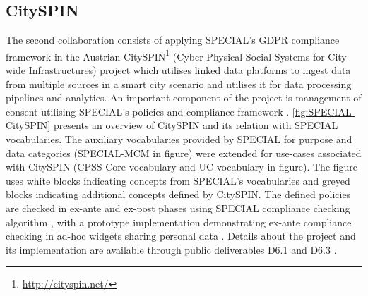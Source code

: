 

\subsection*{CitySPIN}
The second collaboration consists of applying SPECIAL's GDPR compliance framework in the Austrian CitySPIN\footnote{\url{http://cityspin.net/}} (Cyber-Physical Social Systems for City-wide Infrastructures) project \cite{fernandez_user_2019} which utilises linked data platforms to ingest data from multiple sources in a smart city scenario and utilises it for data processing pipelines and analytics. An important component of the project is management of consent utilising SPECIAL's policies \cite{bonatti_special_2018-1,bonatti_special_2018-2} and compliance framework \cite{kirrane_scalable_2018}.
\autoref{fig:SPECIAL-CitySPIN} presents an overview of CitySPIN and its relation with SPECIAL vocabularies. The auxiliary vocabularies provided by SPECIAL for purpose and data categories (SPECIAL-MCM in figure) were extended for use-cases associated with CitySPIN (CPSS Core vocabulary and UC vocabulary in figure).
The figure uses white blocks indicating concepts from SPECIAL's vocabularies and greyed blocks indicating additional concepts defined by CitySPIN.
The defined policies are checked in ex-ante and ex-post phases using SPECIAL compliance checking algorithm \cite{bonatti_fast_2018,bonatti_richer_2019}, with a prototype implementation demonstrating ex-ante compliance checking in ad-hoc widgets sharing personal data \cite{fernandez_privacy-aware_2019}. Details about the project and its implementation are available through  public deliverables D6.1 \cite{noauthor_d6.1_2018} and D6.3 \cite{noauthor_d6.3_2019}.
